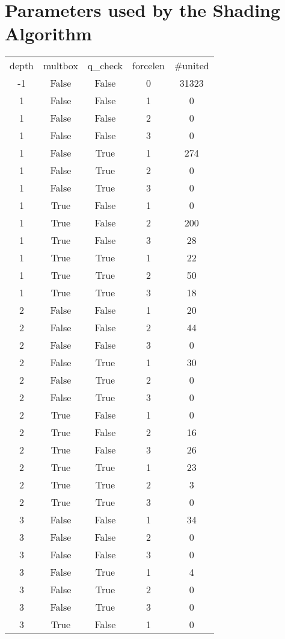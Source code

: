 \documentclass[12pt,reqno]{amsart}
\theoremstyle{plain}
\theoremstyle{definition}
\numberwithin{equation}{section}
\begin{document}
\section{Parameters used by the Shading Algorithm}
\begin{longtable}{ccccc} 
depth & multbox & q\_{}check & forcelen & \#united \\ 
-1 & False & False & 0 & 31323 \\ 
1 & False & False & 1 & 0 \\ 
1 & False & False & 2 & 0 \\ 
1 & False & False & 3 & 0 \\ 
1 & False & True & 1 & 274 \\ 
1 & False & True & 2 & 0 \\ 
1 & False & True & 3 & 0 \\ 
1 & True & False & 1 & 0 \\ 
1 & True & False & 2 & 200 \\ 
1 & True & False & 3 & 28 \\ 
1 & True & True & 1 & 22 \\ 
1 & True & True & 2 & 50 \\ 
1 & True & True & 3 & 18 \\ 
2 & False & False & 1 & 20 \\ 
2 & False & False & 2 & 44 \\ 
2 & False & False & 3 & 0 \\ 
2 & False & True & 1 & 30 \\ 
2 & False & True & 2 & 0 \\ 
2 & False & True & 3 & 0 \\ 
2 & True & False & 1 & 0 \\ 
2 & True & False & 2 & 16 \\ 
2 & True & False & 3 & 26 \\ 
2 & True & True & 1 & 23 \\ 
2 & True & True & 2 & 3 \\ 
2 & True & True & 3 & 0 \\ 
3 & False & False & 1 & 34 \\ 
3 & False & False & 2 & 0 \\ 
3 & False & False & 3 & 0 \\ 
3 & False & True & 1 & 4 \\ 
3 & False & True & 2 & 0 \\ 
3 & False & True & 3 & 0 \\ 
3 & True & False & 1 & 0 \\ 

\end{longtable}
\end{document}
